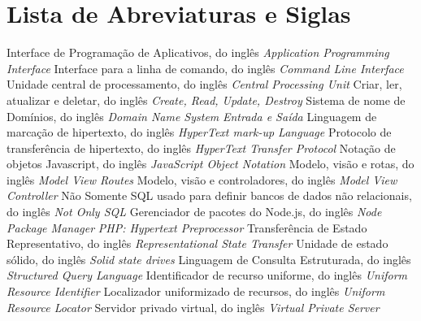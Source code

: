\chapter*{Lista de Abreviaturas e Siglas}


\begin{acronym}
 {Interface de Programação de Aplicativos, do inglês \textit{Application Programming Interface}}
 {Interface para a linha de comando, do inglês \textit{Command Line Interface}}
 {Unidade central de processamento, do inglês \textit{Central Processing Unit}}
 {Criar, ler, atualizar e deletar, do inglês \textit{Create, Read, Update, Destroy}}
 {Sistema de nome de Domínios, do inglês \textit{Domain Name System}}
 {\textit{Entrada e Saída}}
 {Linguagem de marcação de hipertexto, do inglês \textit{HyperText mark-up Language}}
 {Protocolo de transferência de hipertexto, do inglês \textit{HyperText Transfer Protocol}}
 {Notação de objetos Javascript, do inglês \textit{JavaScript Object Notation}}
 {Modelo, visão e rotas, do inglês \textit{Model View Routes}}
 {Modelo, visão e controladores, do inglês \textit{Model View Controller}}
 {Não Somente SQL usado para definir bancos de dados não relacionais, do inglês \textit{Not Only SQL}}
 {Gerenciador de pacotes do Node.js, do inglês \textit{Node Package Manager}}
 {\textit{PHP: Hypertext Preprocessor}}
 {Transferência de Estado Representativo, do inglês \textit{Representational State Transfer}}
 {Unidade de estado sólido, do inglês \textit{Solid state drives}}
 {Linguagem de Consulta Estruturada, do inglês \textit{Structured Query Language}}
 {Identificador de recurso uniforme, do inglês \textit{Uniform Resource Identifier}}
 {Localizador uniformizado de recursos, do inglês \textit{Uniform Resource Locator}}
 {Servidor privado virtual, do inglês \textit{Virtual Private Server}}




\end{acronym}
